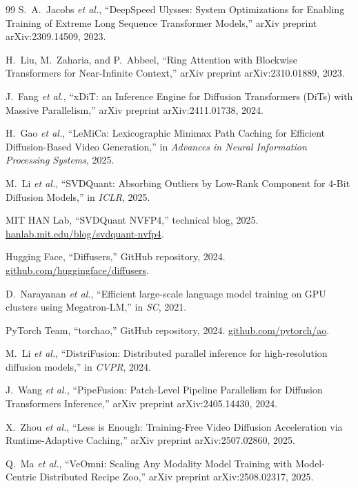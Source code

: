 \documentclass[10pt]{article}
\begin{document}
\begin{thebibliography}{99}
S.~A.~Jacobs \textit{et al.}, ``DeepSpeed Ulysses: System Optimizations for Enabling Training of Extreme Long Sequence Transformer Models,'' arXiv preprint arXiv:2309.14509, 2023.

H.~Liu, M.~Zaharia, and P.~Abbeel, ``Ring Attention with Blockwise Transformers for Near-Infinite Context,'' arXiv preprint arXiv:2310.01889, 2023.

J.~Fang \textit{et al.}, ``xDiT: an Inference Engine for Diffusion Transformers (DiTs) with Massive Parallelism,'' arXiv preprint arXiv:2411.01738, 2024.

H.~Gao \textit{et al.}, ``LeMiCa: Lexicographic Minimax Path Caching for Efficient Diffusion-Based Video Generation,'' in \textit{Advances in Neural Information Processing Systems}, 2025.

M.~Li \textit{et al.}, ``SVDQuant: Absorbing Outliers by Low-Rank Component for 4-Bit Diffusion Models,'' in \textit{ICLR}, 2025.

MIT HAN Lab, ``SVDQuant NVFP4,'' technical blog, 2025. \href{https://hanlab.mit.edu/blog/svdquant-nvfp4}{hanlab.mit.edu/blog/svdquant-nvfp4}.

Hugging Face, ``Diffusers,'' GitHub repository, 2024. \href{https://github.com/huggingface/diffusers}{github.com/huggingface/diffusers}.

D.~Narayanan \textit{et al.}, ``Efficient large-scale language model training on GPU clusters using Megatron-LM,'' in \textit{SC}, 2021.

PyTorch Team, ``torchao,'' GitHub repository, 2024. \href{https://github.com/pytorch/ao}{github.com/pytorch/ao}.

M.~Li \textit{et al.}, ``DistriFusion: Distributed parallel inference for high-resolution diffusion models,'' in \textit{CVPR}, 2024.

J.~Wang \textit{et al.}, ``PipeFusion: Patch-Level Pipeline Parallelism for Diffusion Transformers Inference,'' arXiv preprint arXiv:2405.14430, 2024.

X.~Zhou \textit{et al.}, ``Less is Enough: Training-Free Video Diffusion Acceleration via Runtime-Adaptive Caching,'' arXiv preprint arXiv:2507.02860, 2025.

Q.~Ma \textit{et al.}, ``VeOmni: Scaling Any Modality Model Training with Model-Centric Distributed Recipe Zoo,'' arXiv preprint arXiv:2508.02317, 2025.


\end{thebibliography}
\end{document}
